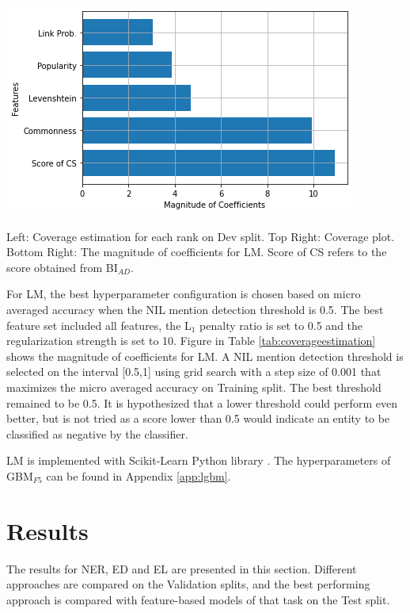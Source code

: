 \documentclass{report}
\theoremstyle{definition}
\theoremstyle{remark}
\begin{document}
\begin{table}
\begin{minipage}{0.5\linewidth}
		\hspace*{-1cm}\includegraphics[scale=0.5]{rerankercoef.png}
	\end{minipage}
	\caption{Left: Coverage estimation for each rank on Dev split. Top Right: Coverage plot. Bottom Right: The magnitude of coefficients for LM. Score of CS refers to the score obtained from BI$_{AD}$.}
	\label{tab:coverageestimation}
\end{table}

For LM, the best hyperparameter configuration is chosen based on micro averaged accuracy when the NIL mention detection threshold is 0.5. The best feature set included all features, the L$_1$ penalty ratio is set to 0.5 and the regularization strength is set to 10. Figure in Table \ref{tab:coverageestimation} shows the magnitude of coefficients for LM. A NIL mention detection threshold is selected on the interval [0.5,1] using grid search with a step size of 0.001 that maximizes the micro averaged accuracy on Training split. The best threshold remained to be 0.5. It is hypothesized that a lower threshold could perform even better, but is not tried as a score lower than 0.5 would indicate an entity to be classified as negative by the classifier. 

LM is implemented with Scikit-Learn Python library \cite{scikit}. The hyperparameters of GBM$_{F5}$ can be found in Appendix \ref{app:lgbm}.

\section{Results}
\label{sec:EvalResults}
The results for NER, ED and EL are presented in this section. Different approaches are compared on the Validation splits, and the best performing approach is compared with feature-based models of that task on the Test split.
\end{document}
